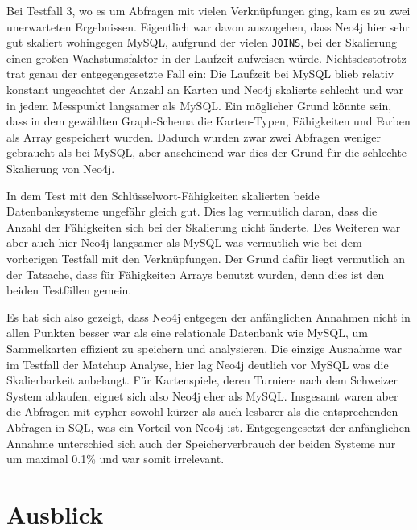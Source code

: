 Bei Testfall 3, wo es um Abfragen mit vielen Verknüpfungen ging, kam es zu zwei unerwarteten Ergebnissen. Eigentlich war davon auszugehen, dass Neo4j hier sehr gut skaliert wohingegen MySQL, aufgrund der vielen \verb|JOINS|, bei der Skalierung einen großen Wachstumsfaktor in der Laufzeit aufweisen würde. Nichtsdestotrotz trat genau der entgegengesetzte Fall ein: Die Laufzeit bei MySQL blieb relativ konstant ungeachtet der Anzahl an Karten und Neo4j skalierte schlecht und war in jedem Messpunkt langsamer als MySQL. Ein möglicher Grund könnte sein, dass in dem gewählten Graph-Schema die Karten-Typen, Fähigkeiten und Farben als Array gespeichert wurden. Dadurch wurden zwar zwei Abfragen weniger gebraucht als bei MySQL, aber anscheinend war dies der Grund für die schlechte Skalierung von Neo4j.

In dem Test mit den Schlüsselwort-Fähigkeiten skalierten beide Datenbanksysteme ungefähr gleich gut. Dies lag vermutlich daran, dass die Anzahl der Fähigkeiten sich bei der Skalierung nicht änderte. Des Weiteren war aber auch hier Neo4j langsamer als MySQL was vermutlich wie bei dem vorherigen Testfall mit den Verknüpfungen. Der Grund dafür liegt vermutlich an der Tatsache, dass für Fähigkeiten Arrays benutzt wurden, denn dies ist den beiden Testfällen gemein.

Es hat sich also gezeigt, dass Neo4j entgegen der anfänglichen Annahmen nicht in allen Punkten besser war als eine relationale Datenbank wie MySQL, um Sammelkarten effizient zu speichern und analysieren. Die einzige Ausnahme war im Testfall der Matchup Analyse, hier lag Neo4j deutlich vor MySQL was die Skalierbarkeit anbelangt. Für Kartenspiele, deren Turniere nach dem Schweizer System ablaufen, eignet sich also Neo4j eher als MySQL. Insgesamt waren aber die Abfragen mit cypher sowohl kürzer als auch lesbarer als die entsprechenden Abfragen in SQL, was ein Vorteil von Neo4j ist. Entgegengesetzt der anfänglichen Annahme unterschied sich auch der Speicherverbrauch der beiden Systeme nur um maximal 0.1\% und war somit irrelevant.

\section{Ausblick}

